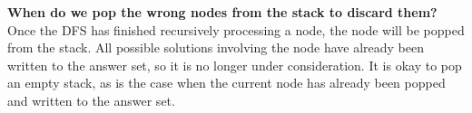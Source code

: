 \documentclass{exam}
\begin{document}
\begin{questions}
{\bf When do we pop the wrong nodes from the stack to discard them?}\\
Once the DFS has finished recursively processing a node, the node will be popped from the stack. All possible solutions involving the node have already been written to the answer set, so it is no longer under consideration. It is okay to pop an empty stack, as is the case when the current node has already been popped and written to the answer set.\\


\vspace{0.3in}







\end{questions}
\end{document}
